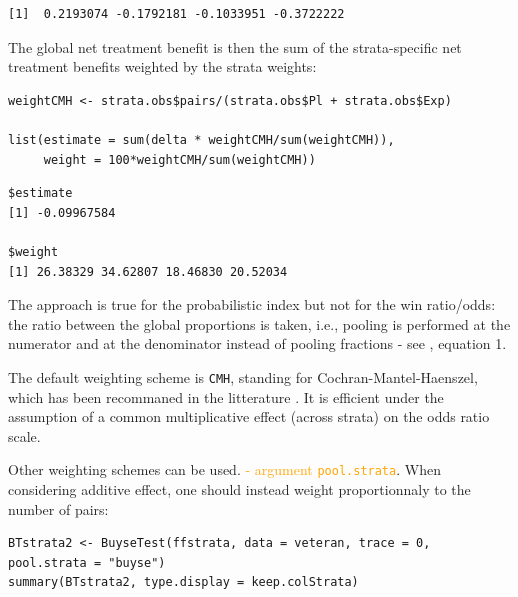 \documentclass[12pt]{article}
\newcommand\Warning[1][3ex]{%
\renewcommand\stacktype{L}%
\scaleto{\stackon[1.3pt]{\color{red}$\triangle$}{\tiny\bfseries !}}{#1}%
\xspace
}
\begin{document}
\begin{verbatim}
[1]  0.2193074 -0.1792181 -0.1033951 -0.3722222
\end{verbatim}


The global net treatment benefit is then the sum of the strata-specific net
treatment benefits weighted by the strata weights:
\lstset{language=r,label= ,caption= ,captionpos=b,numbers=none}
\begin{lstlisting}
weightCMH <- strata.obs$pairs/(strata.obs$Pl + strata.obs$Exp)

list(estimate = sum(delta * weightCMH/sum(weightCMH)),
     weight = 100*weightCMH/sum(weightCMH))
\end{lstlisting}

\begin{verbatim}
$estimate
[1] -0.09967584

$weight
[1] 26.38329 34.62807 18.46830 20.52034
\end{verbatim}


\Warning The approach is true for the probabilistic index but not for
the win ratio/odds: the ratio between the global proportions is taken,
i.e., pooling is performed at the numerator and at the denominator
instead of pooling fractions - see \cite{dong2018stratified},
equation 1.


\clearpage

The default weighting scheme is \texttt{CMH}, standing for
Cochran-Mantel-Haenszel, which has been recommaned in the litterature
\citep{dong2018stratified}. It is efficient under the assumption of a
common multiplicative effect (across strata) on the odds ratio
scale. 

\bigskip 

Other weighting schemes can be used. \hfill
\textcolor{orange}{- argument
\texttt{pool.strata}}. \newline When considering additive effect,
one should instead weight proportionnaly to the number of pairs:
\lstset{language=r,label= ,caption= ,captionpos=b,numbers=none}
\begin{lstlisting}
BTstrata2 <- BuyseTest(ffstrata, data = veteran, trace = 0, pool.strata = "buyse")
summary(BTstrata2, type.display = keep.colStrata)
\end{lstlisting}
\end{document}
